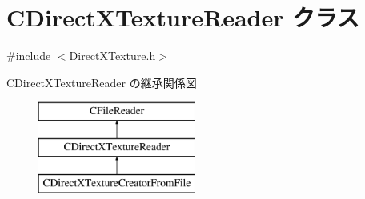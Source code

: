 \hypertarget{class_c_direct_x_texture_reader}{}\section{C\+Direct\+X\+Texture\+Reader クラス}
\label{class_c_direct_x_texture_reader}


{\ttfamily \#include $<$Direct\+X\+Texture.\+h$>$}

C\+Direct\+X\+Texture\+Reader の継承関係図\begin{figure}[H]
\begin{center}
\leavevmode
\includegraphics[height=3.000000cm]{class_c_direct_x_texture_reader}
\end{center}
\end{figure}
